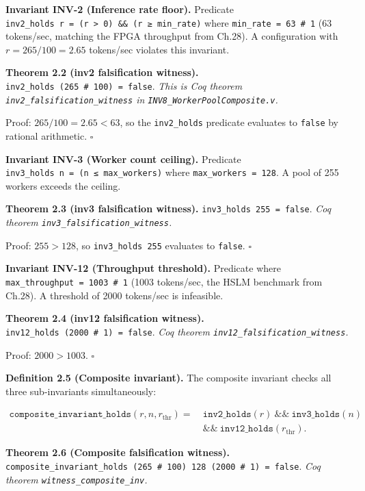 \textbf{Invariant INV-2 (Inference rate floor).}
Predicate
\texttt{inv2\_holds\ r\ =\ (r\ \textgreater{}\ 0)\ \&\&\ (r\ ≥\ min\_rate)}
where \texttt{min\_rate\ =\ 63\ \#\ 1} (63
tokens/sec, matching the FPGA throughput from
Ch.28). A configuration with
\(r = 265/100 = 2.65\) tokens/sec violates this
invariant.

\textbf{Theorem 2.2 (inv2 falsification witness).}
\texttt{inv2\_holds\ (265\ \#\ 100)\ =\ false}.
\emph{This is Coq theorem
\texttt{inv2\_falsification\_witness} in
\texttt{INV8\_WorkerPoolComposite.v}.}

Proof: \(265/100 = 2.65 < 63\), so the
\texttt{inv2\_holds} predicate evaluates to
\texttt{false} by rational arithmetic. \(\square\)

\textbf{Invariant INV-3 (Worker count ceiling).}
Predicate
\texttt{inv3\_holds\ n\ =\ (n\ ≤\ max\_workers)}
where \texttt{max\_workers\ =\ 128}. A pool of 255
workers exceeds the ceiling.

\textbf{Theorem 2.3 (inv3 falsification witness).}
\texttt{inv3\_holds\ 255\ =\ false}. \emph{Coq
theorem \texttt{inv3\_falsification\_witness}.}

Proof: \(255 > 128\), so \texttt{inv3\_holds\ 255}
evaluates to \texttt{false}. \(\square\)

\textbf{Invariant INV-12 (Throughput threshold).}
Predicate
where \texttt{max\_throughput\ =\ 1003\ \#\ 1}
(1003 tokens/sec, the HSLM benchmark from Ch.28).
A threshold of 2000 tokens/sec is infeasible.

\textbf{Theorem 2.4 (inv12 falsification
witness).}
\texttt{inv12\_holds\ (2000\ \#\ 1)\ =\ false}.
\emph{Coq theorem
\texttt{inv12\_falsification\_witness}.}

Proof: \(2000 > 1003\). \(\square\)

\textbf{Definition 2.5 (Composite invariant).} The
composite invariant checks all three
sub-invariants simultaneously:

\begin{align*}
\texttt{composite\_invariant\_holds}(r, n, r_\text{thr}) =\ &\texttt{inv2\_holds}(r)\ \&\&\ \texttt{inv3\_holds}(n) \\
&\&\&\ \texttt{inv12\_holds}(r_\text{thr}).
\end{align*}

\textbf{Theorem 2.6 (Composite falsification
witness).}
\texttt{composite\_invariant\_holds\ (265\ \#\ 100)\ 128\ (2000\ \#\ 1)\ =\ false}.
\emph{Coq theorem
\texttt{witness\_composite\_inv}.}

